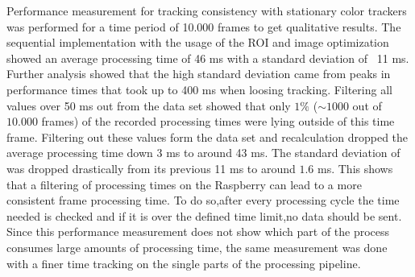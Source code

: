 Performance measurement for tracking consistency with stationary color trackers was performed for a time period of 10.000 frames to get qualitative results. The sequential implementation with the usage of the ROI and image optimization showed an average processing time of 46 ms with a standard deviation of ~11 ms.\\
Further analysis showed that the high standard deviation came from peaks in performance times that took up to 400 ms when loosing tracking. Filtering all values over 50 ms out from the data set showed that only $1\%$ ($\sim 1000$ out of $10.000$ frames) of the recorded processing times were lying outside of this time frame. Filtering out these values form the data set and recalculation dropped the average processing time down 3 ms to around 43 ms. The standard deviation of was dropped drastically from its previous 11 ms to around $1.6$ ms. This shows that a filtering of processing times on the Raspberry can lead to a more consistent frame processing time. To do so,after every processing cycle the time needed is checked and if it is over the defined time limit,no data should be sent.\\
Since this performance measurement does not show which part of the process consumes large amounts of processing time, the same measurement was done with a finer time tracking on the single parts of the processing pipeline.
